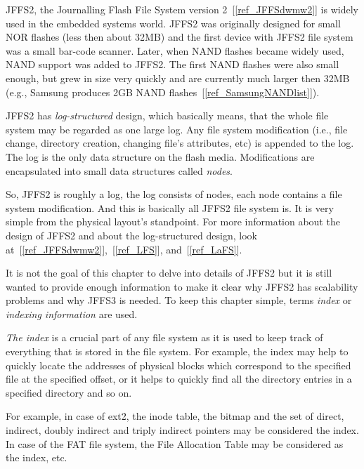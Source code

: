 %
%
%
%

JFFS2, the Journalling Flash File System version 2~[\ref{ref_JFFSdwmw2}] is
widely used in the embedded systems world. JFFS2 was originally designed for
small NOR flashes (less then about 32MB) and the first device with JFFS2 file
system was a small \mbox{bar-code} scanner. Later, when NAND flashes became
widely used, NAND support was added to JFFS2. The first NAND flashes were also
small enough, but grew in size very quickly and are currently much larger then
32MB (e.g., Samsung produces 2GB NAND flashes~[\ref{ref_SamsungNANDlist}]).

JFFS2 has \emph{\mbox{log-structured}} design, which basically means, that the
whole file system may be regarded as one large log. Any file system
modification (i.e., file change, directory creation, changing file's
attributes, etc) is appended to the log. The log is the only data structure on
the flash media. Modifications are encapsulated into small data structures
called \emph{nodes}.

So, JFFS2 is roughly a log, the log consists of nodes, each node contains a
file system modification. And this is basically all JFFS2 file system is. It is
very simple from the physical layout's standpoint. For more
information about the design of JFFS2 and about the \mbox{log-structured}
design, look at~[\ref{ref_JFFSdwmw2}],~[\ref{ref_LFS}], and~[\ref{ref_LaFS}].

It is not the goal of this chapter to delve into details of JFFS2 but it is
still wanted to provide enough information to make it clear why JFFS2 has
scalability problems and why JFFS3 is needed. To keep this chapter simple,
terms \emph{index} or \emph{indexing information} are used.

\emph{The index} is a crucial part of any file system as it is used to keep
track of everything that is stored in the file system. For example, the index
may help to quickly locate the addresses of physical blocks which correspond
to the specified file at the specified offset, or it helps to quickly find all
the directory entries in a specified directory and so on.

For example, in case of ext2, the inode table, the bitmap and the set of
direct, indirect, doubly indirect and triply indirect pointers may be
considered the index. In case of the FAT file system, the File Allocation Table
may be considered as the index, etc.

